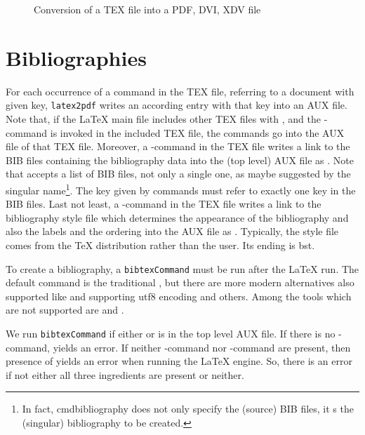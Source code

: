 \begin{figure}[htb]
\centering
{}
\caption{\label{fig:tex2pdf}Conversion of a TEX file into a PDF, DVI, XDV file }
\end{figure}

\section{Bibliographies}\label{sec:bibtex}

For each occurrence 
of a command  in the TEX file, 
referring to a document with given key,
\texttt{latex2pdf} writes an according entry  with that key 
into an AUX file. 
Note that, 
if the \LaTeX{} main file includes other TEX files with , 
and the -command is invoked in the included TEX file, 
the  commands go into the AUX file of that TEX file. 
Moreover, a -command in the TEX file 
writes a link to the BIB files containing the bibliography data 
into the (top level) AUX file as . 
Note that  accepts a list of BIB files, not only a single one, 
as maybe suggested by the singular name\footnote%
{In fact, cmd{bibliography} does not only specify the (source) BIB files, 
it s the (singular) bibliography to be created.}. 
The key given by  commands must refer to exactly one key in the BIB files. 
Last not least, a -command in the TEX file 
writes a link to the bibliography style file 
which determines the appearance of the bibliography 
and also the labels and the ordering 
into the AUX file as . 
Typically, the style file comes from the \TeX{} distribution rather than the user. 
Its ending is \gls{bst}. 

To create a bibliography, 
a \texttt{bibtexCommand} must be run after the \LaTeX{} run. 
The default command is the traditional , 
but there are more modern alternatives also supported
like  and  supporting utf8 encoding 
and others. 
Among the tools which are not supported are  and . 

We run \texttt{bibtexCommand} if either  or  
is in the top level AUX file. 
If there is no -command,  yields an error. 
If neither -command nor -command 
are present, then presence of  yields an error when running the \LaTeX{} engine. 
So, there is an error if not either all three ingredients are present or neither. 

